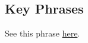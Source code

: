 		
		
	
		
		
	
		
		
\subsection{Key Phrases} %
	\label{OUTWARD-PHRASES}

	\begin{compactdesc}
		\item[outward ordinance] See this phrase \hyperref[ORDINANCE-PHRASES]{here}.
	\end{compactdesc}
	
